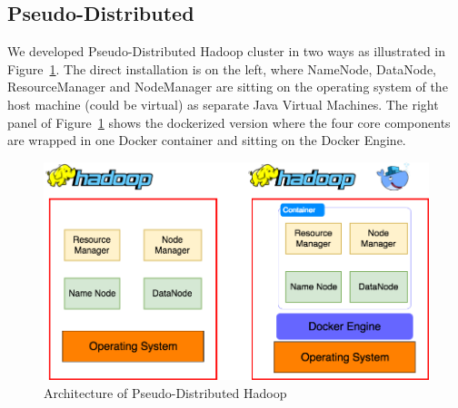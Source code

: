 \subsection{Pseudo-Distributed}

We developed Pseudo-Distributed Hadoop cluster in two ways as illustrated 
in Figure~\ref{f:hadoop-pseudo}. The direct installation is on the left, where 
NameNode, DataNode, ResourceManager and NodeManager are sitting on 
the operating system of the host machine (could be virtual) as separate Java 
Virtual Machines. The right panel of Figure~\ref{f:hadoop-pseudo} shows the 
dockerized version where the four core components are wrapped in one 
Docker container and sitting on the Docker Engine. 

\begin{figure}[!ht]
	\centering\includegraphics[width=\columnwidth]{images/hadoop-docker-pseudo.png}
	\caption{Architecture of Pseudo-Distributed 
	Hadoop}\label{f:hadoop-pseudo}
\end{figure}

